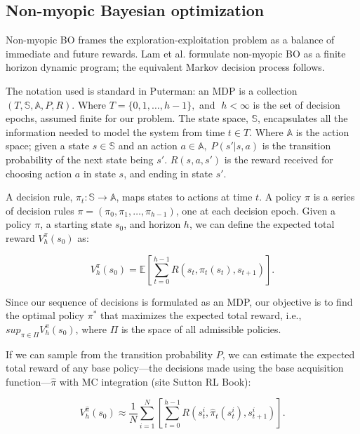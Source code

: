 \documentclass{article}
\begin{document}
\subsection{Non-myopic Bayesian optimization}
Non-myopic BO frames the exploration-exploitation problem as a balance of immediate and future 
rewards. Lam et al.\cite{Lam2016} formulate non-myopic BO as a finite horizon dynamic program; the equivalent 
Markov decision process follows.

The notation used is standard in Puterman\cite{puterman2014markov}: an MDP is a collection $(T, \mathbb{S}, \mathbb{A}, P, 
R)$. Where $T = \{0,1,\dots,h-1\}, $ and $\;h < \infty$ is the set of decision epochs, assumed finite for our 
problem. The state space, $\mathbb{S}$, encapsulates all the information needed to model the system 
from time $t \in T$. Where $\mathbb{A}$ is the action space; given a state $s \in \mathbb{S}$ and an 
action $a \in \mathbb{A}, \; P(s'|s,a)$ is the transition probability of the next state being $s'$. 
$R(s,a,s')$ is the reward received for choosing action $a$ in state $s$, and ending in state $s'$.

A decision rule, $\pi_t : \mathbb{S} \to \mathbb{A}$, maps states to actions at time $t$. A policy 
$\pi$ is a series of decision rules $\pi = (\pi_0, \pi_1, \dots, \pi_{h-1})$, one at each decision 
epoch. Given a policy $\pi$, a starting state $s_0$, and horizon $h$, we can define the expected 
total reward $V_h^\pi(s_0)$ as:

$$
V_h^\pi(s_0) = \mathbb{E}\left[ \sum_{t=0}^{h-1} R(s_t, \pi_t(s_t), s_{t+1}) \right].
$$

Since our sequence of decisions is formulated as an MDP, our objective is to find the optimal policy 
$\pi^*$ that maximizes the expected total reward, i.e., $sup_{\pi \in \Pi}V_h^\pi(s_0)$, where $\Pi$ 
is the space of all admissible policies.

If we can sample from the transition probability $P$, we can estimate the expected total reward of
any base policy---the decisions made using the base acquisition function---$\hat{\pi}$ with MC integration (site Sutton RL Book):


$$
V_h^{\hat{\pi}}(s_0) \approx \frac{1}{N}\sum_{i=1}^N\left[\sum_{t=0}^{h-1}R(s_t^i, 
\hat{\pi}_t(s_t^i), s^i_{t+1})\right].
$$
\end{document}
